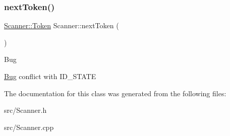 \subsubsection{\texorpdfstring{next\+Token()}{nextToken()}}
{\footnotesize\ttfamily \hyperlink{struct_scanner_1_1_token}{Scanner\+::\+Token} Scanner\+::next\+Token (\begin{DoxyParamCaption}{ }\end{DoxyParamCaption})}

\begin{DoxyRefDesc}{Bug}
\item[\hyperlink{bug__bug000001}{Bug}]conflict with I\+D\+\_\+\+S\+T\+A\+TE \end{DoxyRefDesc}


The documentation for this class was generated from the following files\+:\begin{DoxyCompactItemize}
\item 
src/Scanner.\+h\item 
src/Scanner.\+cpp\end{DoxyCompactItemize}

